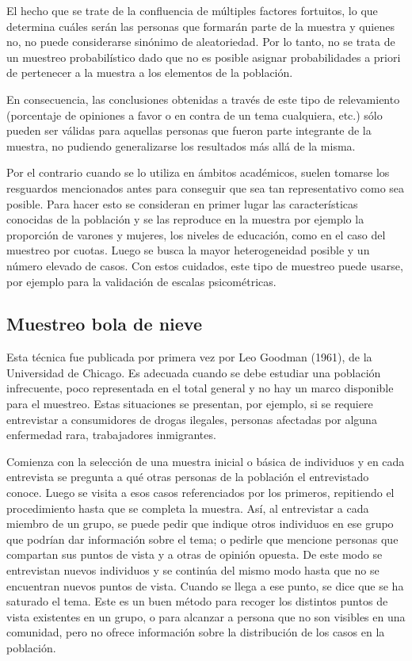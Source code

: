 \documentclass[]{book}
\begin{document}
El hecho que se trate de la confluencia de múltiples factores fortuitos,
lo que determina cuáles serán las personas que formarán parte de la
muestra y quienes no, no puede considerarse sinónimo de aleatoriedad.
Por lo tanto, no se trata de un muestreo probabilístico dado que no es
posible asignar probabilidades a priori de pertenecer a la muestra a los
elementos de la población.

En consecuencia, las conclusiones obtenidas a través de este tipo de
relevamiento (porcentaje de opiniones a favor o en contra de un tema
cualquiera, etc.) sólo pueden ser válidas para aquellas personas que
fueron parte integrante de la muestra, no pudiendo generalizarse los
resultados más allá de la misma.

Por el contrario cuando se lo utiliza en ámbitos académicos, suelen
tomarse los resguardos mencionados antes para conseguir que sea tan
representativo como sea posible. Para hacer esto se consideran en primer
lugar las características conocidas de la población y se las reproduce
en la muestra por ejemplo la proporción de varones y mujeres, los
niveles de educación, como en el caso del muestreo por cuotas. Luego se
busca la mayor heterogeneidad posible y un número elevado de casos. Con
estos cuidados, este tipo de muestreo puede usarse, por ejemplo para la
validación de escalas psicométricas.

\hypertarget{muestreo-bola-de-nieve}{%
\subsection{Muestreo bola de nieve}\label{muestreo-bola-de-nieve}}

Esta técnica fue publicada por primera vez por Leo Goodman (1961), de la
Universidad de Chicago. Es adecuada cuando se debe estudiar una
población infrecuente, poco representada en el total general y no hay un
marco disponible para el muestreo. Estas situaciones se presentan, por
ejemplo, si se requiere entrevistar a consumidores de drogas ilegales,
personas afectadas por alguna enfermedad rara, trabajadores inmigrantes.

Comienza con la selección de una muestra inicial o básica de individuos
y en cada entrevista se pregunta a qué otras personas de la población el
entrevistado conoce. Luego se visita a esos casos referenciados por los
primeros, repitiendo el procedimiento hasta que se completa la muestra.
Así, al entrevistar a cada miembro de un grupo, se puede pedir que
indique otros individuos en ese grupo que podrían dar información sobre
el tema; o pedirle que mencione personas que compartan sus puntos de
vista y a otras de opinión opuesta. De este modo se entrevistan nuevos
individuos y se continúa del mismo modo hasta que no se encuentran
nuevos puntos de vista. Cuando se llega a ese punto, se dice que se ha
saturado el tema. Este es un buen método para recoger los distintos
puntos de vista existentes en un grupo, o para alcanzar a persona que no
son visibles en una comunidad, pero no ofrece información sobre la
distribución de los casos en la población.
\end{document}
